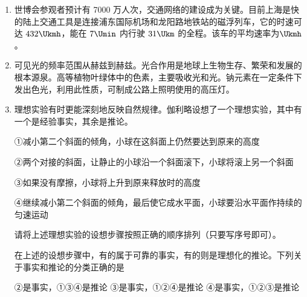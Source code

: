 \documentclass[\gkver]{gaokaozhenti}
\begin{document}
\begin{enumerate}
{$12:5$}
{$24:1$}
{$48:7$}


\item
世博会参观者预计有 7000 万人次，交通网络的建设成为关键。目前上海是快的陆上交通工具是连接浦东国际机场和龙阳路地铁站的磁浮列车，它的时速可达 $432\Ukmh$，能在 $7\Umin$ 内行驶 $31\Ukm$ 的全程。该车的平均速率为$\Ukmh$。


\item
可见光的频率范围从赫兹到赫兹。光合作用是地球上生物生存、繁荣和发展的根本源泉。高等植物叶绿体中的色素，主要吸收光和光。钠元素在一定条件下发出色光，利用此性质，可制成公路上照明使用的高压灯。


\item
理想实验有时更能深刻地反映自然规律。伽利略设想了一个理想实验，其中有一个是经验事实，其余是推论。

①减小第二个斜面的倾角，小球在这斜面上仍然要达到原来的高度

②两个对接的斜面，让静止的小球沿一个斜面滚下，小球将滚上另一个斜面

③如果没有摩擦，小球将上升到原来释放时的高度

④继续减小第二个斜面的倾角，最后使它成水平面，小球要沿水平面作持续的匀速运动


请将上述理想实验的设想步骤按照正确的顺序排列（只要写序号即可）。

在上述的设想步骤中，有的属于可靠的事实，有的则是理想化的推论。下列关于事实和推论的分类正确的是

{②是事实，①③④是推论}
{③是事实，①②④是推论}
{④是事实，①②③是推论}


\end{enumerate}
\end{document}
